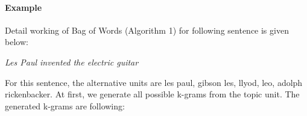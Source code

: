 \documentclass[11pt]{article}
\begin{document}
%

\paragraph{Example}
Detail working of Bag of Words (Algorithm 1) for following sentence is given below:

\emph{Les Paul invented the electric guitar}

For this sentence, the alternative units are les paul, gibson les, llyod, leo, adolph rickenbacker. At first, we generate all possible k-grams from the topic unit. The generated k-grams are following:
\end{document}
